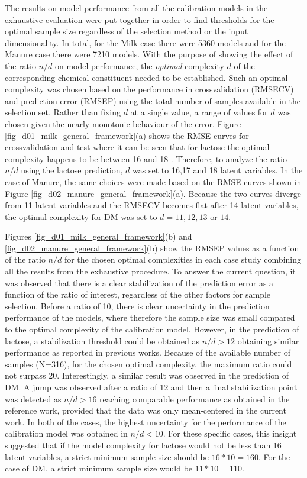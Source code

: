 \documentclass[journal=ancham,manuscript=article]{achemso}
\begin{document}
The results on model performance from all the calibration models in the exhaustive evaluation were put together in order to find thresholds for the optimal sample size regardless of the selection method or the input dimensionality. In total, for the Milk case there were 5360 models and for the Manure case there were 7210 models. With the purpose of showing the effect of the ratio $n/d$ on model performance, the \emph{optimal} complexity $d$ of the corresponding chemical constituent needed to be established. Such an optimal complexity was chosen based on the performance in crossvalidation (RMSECV) and prediction error (RMSEP) using the total number of samples available in the selection set. Rather than fixing $d$ at a single value, a range of values for $d$ was chosen given the nearly monotonic behaviour of the error. 
Figure \ref{fig_d01_milk_general_framework}(a) shows the RMSE curves for crossvalidation and test where it can be seen that for lactose the optimal complexity happens to be between 16 and 18 \cite{Diaz-Olivares2020}. Therefore, to analyze the ratio $n/d$ using the lactose prediction, $d$ was set to 16,17 and 18 latent variables. In the case of Manure, the same choices were made based on the RMSE curves shown in Figure \ref{fig_d02_manure_general_framework}(a). Because the two curves diverge from 11 latent variables and the RMSECV becomes flat after 14 latent variables, the optimal complexity for DM was set to $d = 11,12,13 \text{ or } 14$\cite{Saeys2005}. 

Figures \ref{fig_d01_milk_general_framework}(b) and \ref{fig_d02_manure_general_framework}(b) show the RMSEP values as a function of the ratio $n/d$ for the chosen optimal complexities in each case study combining all the results from the exhaustive procedure. To answer the current question, it was observed that there is a clear stabilization of the prediction error as a function of the ratio of interest, regardless of the other factors for sample selection. Before a ratio of 10, there is clear uncertainty in the prediction performance of the models, where therefore the sample size was small compared to the optimal complexity of the calibration model. However, in the prediction of lactose, a stabilization threshold could be obtained as $n/d>12$ obtaining similar performance as reported in previous works\cite{Diaz-Olivares2020, Aernouts2011}. Because of the available number of samples (N=316), for the chosen optimal complexity, the maximum ratio could not surpass 20. Interestingly, a similar result was observed in the prediction of DM. A jump was observed after a ratio of 12 and then a final stabilization point was detected as $n/d>16$ reaching comparable performance as obtained in the reference work, provided that the data was only mean-centered in the current work\cite{Saeys2005}. In both of the cases, the highest uncertainty for the performance of the calibration model was obtained in $n/d<10$. For these specific cases, this insight suggested that if the model complexity for lactose would not be less than 16 latent variables, a strict minimum sample size should be $16*10=160$. For the case of DM, a strict minimum sample size would be $11*10=110$. 
\end{document}
